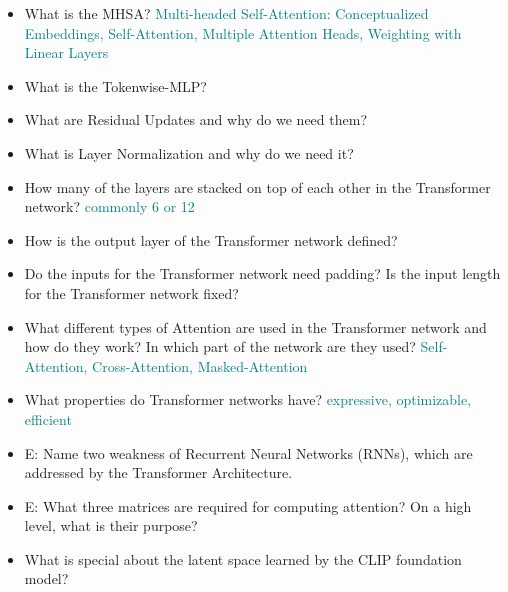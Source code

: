 \documentclass{report}
\newcommand{\asw}[2][teal]{}
\renewcommand{\asw}[2][teal]{\textcolor{#1}{#2}}
\begin{document}
\begin{itemize}
		\item What is the MHSA?
		\asw{\newline Multi-headed Self-Attention: Conceptualized Embeddings, Self-Attention, Multiple Attention Heads, Weighting with Linear Layers}
		\item What is the Tokenwise-MLP?
		\asw{\newline }
		\item What are Residual Updates and why do we need them?
		\asw{\newline }
		\item What is Layer Normalization and why do we need it?
		\asw{\newline }
		\item How many of the layers are stacked on top of each other in the Transformer network?
		\asw{\newline commonly 6 or 12}
		\item How is the output layer of the Transformer network defined?
		\asw{\newline }
		\item Do the inputs for the Transformer network need padding? Is the input length for the Transformer network fixed?
		\asw{\newline }
		\item What different types of Attention are used in the Transformer network and how do they work? In which part of the network are they used?
		\asw{\newline Self-Attention, Cross-Attention, Masked-Attention}
		\item What properties do Transformer networks have?
		\asw{\newline expressive, optimizable, efficient}
		\item E: Name two weakness of Recurrent Neural Networks (RNNs), which are addressed by the Transformer Architecture.
		\asw{\newline }
		\item E: What three matrices are required for computing attention? On a high level, what is their purpose?
		\asw{\newline }
		\item What is special about the latent space learned by the CLIP foundation model?
		\asw{\newline }
		

\end{itemize}
\end{document}
